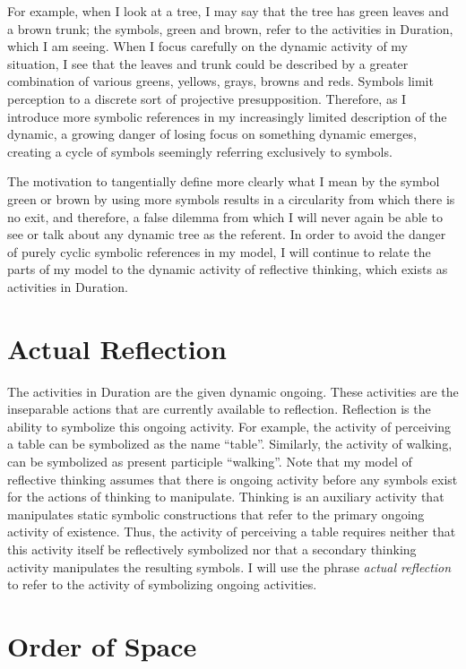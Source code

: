 For example, when I look at a tree, I may say that the tree has green
leaves and a brown trunk; the symbols, green and brown, refer to the
activities in Duration, which I am seeing.  When I focus carefully on
the dynamic activity of my situation, I see that the leaves and trunk
could be described by a greater combination of various greens,
yellows, grays, browns and reds.  Symbols limit perception to a
discrete sort of projective presupposition.  Therefore, as I introduce
more symbolic references in my increasingly limited description of the
dynamic, a growing danger of losing focus on something dynamic
emerges, creating a cycle of symbols seemingly referring exclusively
to symbols.

The motivation to tangentially define more clearly what I mean by the
symbol green or brown by using more symbols results in a circularity
from which there is no exit, and therefore, a false dilemma from which
I will never again be able to see or talk about any dynamic tree as
the referent.  In order to avoid the danger of purely cyclic symbolic
references in my model, I will continue to relate the parts of my
model to the dynamic activity of reflective thinking, which exists as
activities in Duration.

\section{Actual Reflection}

The activities in Duration are the given dynamic ongoing.  These
activities are the inseparable actions that are currently available to
reflection.  Reflection is the ability to symbolize this ongoing
activity.  For example, the activity of perceiving a table can be
symbolized as the name ``table''.  Similarly, the activity of walking,
can be symbolized as present participle ``walking''.  Note that my
model of reflective thinking assumes that there is ongoing activity
before any symbols exist for the actions of thinking to manipulate.
Thinking is an auxiliary activity that manipulates static symbolic
constructions that refer to the primary ongoing activity of existence.
Thus, the activity of perceiving a table requires neither that this
activity itself be reflectively symbolized nor that a secondary
thinking activity manipulates the resulting symbols.  I will use the
phrase \emph{actual reflection} to refer to the activity of
symbolizing ongoing activities.

\section{Order of Space}

